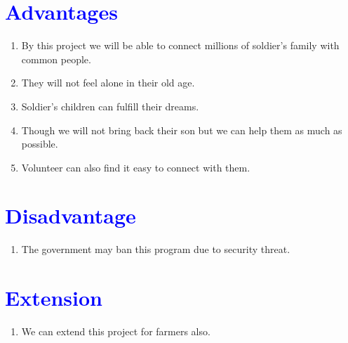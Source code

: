 \documentclass[11pt, a4paper, column]{article}
\begin{document}
\section{\textcolor{blue}{Advantages}}
\begin{enumerate}
  \item By this project we will be able to connect millions of soldier's family with common people.
  \item They will not feel alone in their old age.
  \item Soldier's children can fulfill their dreams.
  \item Though we will not bring back their son but we can help them as much as possible.
  \item Volunteer can also find it easy to connect with them.
\end{enumerate}

\section{\textcolor{blue}{Disadvantage}}
\begin{enumerate}
 \item The government may ban this program due to security threat.
\end{enumerate}

\section{\textcolor{blue}{Extension}}
\begin{enumerate}
 \item We can extend this project for farmers also.
\end{enumerate}
\end{document}
